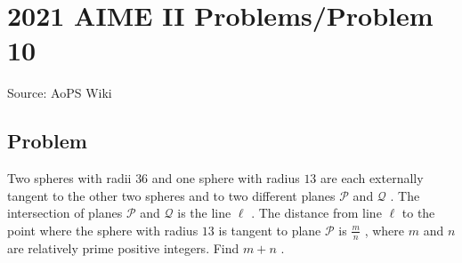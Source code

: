 \documentclass[12pt]{article}
\begin{document}
\section*{{2021 AIME II Problems/Problem 10}}
Source: AoPS Wiki

\subsection*{Problem}
Two spheres with radii $36$ and one sphere with radius $13$ are each externally tangent to the other two spheres and to two different planes $\mathcal{P}$ and $\mathcal{Q}$ . The intersection of planes $\mathcal{P}$ and $\mathcal{Q}$ is the line $\ell$ . The distance from line $\ell$ to the point where the sphere with radius $13$ is tangent to plane $\mathcal{P}$ is $\tfrac{m}{n}$ , where $m$ and $n$ are relatively prime positive integers. Find $m + n$ .
\end{document}
